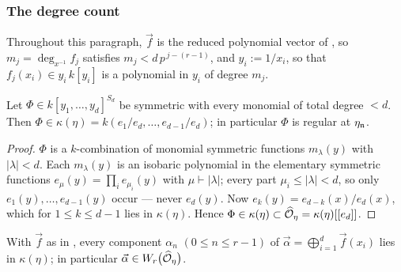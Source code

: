 \subsubsection*{The degree count}

Throughout this paragraph, $\vec f$ is the reduced polynomial vector of
, so $m_j = \deg_{x^{-1}} f_j$ satisfies
$m_j < d\, p^{\,j-(r-1)}$, and $y_i := 1/x_i$, so that $f_j(x_i) \in y_i\, k[y_i]$ is
a polynomial in $y_i$ of degree $m_j$.

\begin{lemma}\label{lemma:symmetric_regularity:reorg}
    Let $\Phi \in k[y_1, \dots, y_d]^{S_d}$ be symmetric with every monomial of total
    degree $< d$. Then $\Phi \in \kappa(\eta) = k(e_1/e_d, \dots, e_{d-1}/e_d)$; in
    particular $\Phi$ is regular at $\eta_{\mathfrak{n}}$.
\end{lemma}

\begin{proof}
    $\Phi$ is a $k$-combination of monomial symmetric functions $m_\lambda(y)$ with
    $|\lambda| < d$. Each $m_\lambda(y)$ is an isobaric polynomial in the elementary
    symmetric functions $e_\mu(y) = \prod_i e_{\mu_i}(y)$ with $\mu \vdash |\lambda|$;
    every part $\mu_i \leq |\lambda| < d$, so only $e_1(y), \dots, e_{d-1}(y)$ occur
    --- never $e_d(y)$. Now $e_k(y) = e_{d-k}(x)/e_d(x)$, which for
    $1 \leq k \leq d-1$ lies in $\kappa(\eta)$. Hence
    $\Phi \in \kappa(\eta) \subset \widehat{\mathcal{O}}_\eta = \kappa(\eta)[[e_d]]$.
\end{proof}

\begin{theorem}\label{theorem:witt_components_regularity:reorg}
    With $\vec f$ as in , every component
    $\alpha_n$ $(0 \leq n \leq r-1)$ of
    $\vec \alpha = \bigoplus_{i=1}^{d} \vec f(x_i)$ lies in $\kappa(\eta)$; in
    particular $\vec \alpha \in W_r\bigl(\widehat{\mathcal{O}}_\eta\bigr)$.
\end{theorem}

